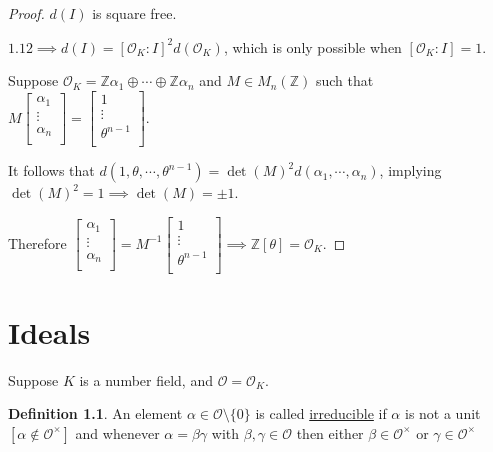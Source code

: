 \documentclass[openany]{amsbook}
\numberwithin{section}{chapter}
\theoremstyle{definition}
\newtheorem*{definition}{Definition}
\begin{document}
\begin{proof}
    \(d(I)\) is square free.
    
    \(1.12 \implies d(I) = [\mathcal{O}_K : I]^2 d(\mathcal{O}_K)\), which is only possible when \([\mathcal{O}_K : I] = 1\).
    
    Suppose \(\mathcal{O}_K = \mathbb{Z} \alpha_1 \oplus \cdots \oplus \mathbb{Z} \alpha_n\) and \(M \in M_n(\mathbb{Z})\) such that \(M \begin{bmatrix}
         \alpha_1 \\
         \vdots \\
         \alpha_n \\
    \end{bmatrix} = \begin{bmatrix}
         1 \\
         \vdots \\
         \theta^{n-1} \\
    \end{bmatrix}\). 

    It follows that \(d(1, \theta , \cdots , \theta^{n-1}) = \det(M)^2 d(\alpha_1, \cdots , \alpha_n)\), implying \(\det(M)^2 = 1\implies \det(M) = \pm 1\). 

    Therefore \(\begin{bmatrix}
         \alpha_1 \\
         \vdots \\
         \alpha_n \\
    \end{bmatrix} = M ^{-1} \begin{bmatrix}
         1 \\
         \vdots \\
         \theta^{n-1} \\
    \end{bmatrix} \implies \mathbb{Z}[\theta] = \mathcal{O}_K\). 
\end{proof}


\chapter{Ideals}

Suppose \(K\) is a number field, and \(\mathcal{O} = \mathcal{O}_K\).

\begin{definition}
    An element \(\alpha \in \mathcal{O} \setminus \{ 0 \} \) is called \underline{irreducible} if \(\alpha\) is not a unit \([\alpha \notin \mathcal{O} ^\times]\) and whenever \(\alpha = \beta \gamma\) with \(\beta , \gamma \in \mathcal{O}\) then either \(\beta \in \mathcal{O} ^\times \) or \(\gamma \in \mathcal{O} ^\times \) 
\end{definition}
\end{document}
